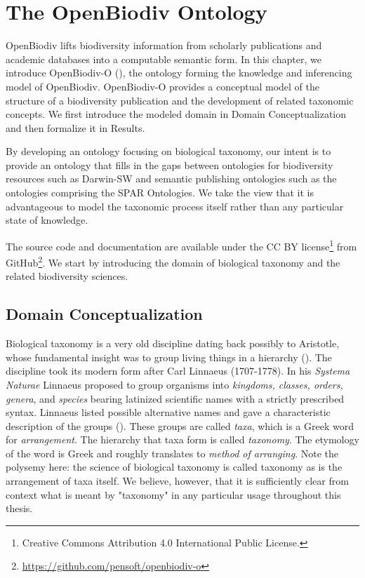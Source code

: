 \chapter{The OpenBiodiv Ontology}

\label{chapter-ontology}

OpenBiodiv lifts biodiversity information from scholarly publications and academic databases into a computable semantic form.  In this chapter, we introduce \mbox{OpenBiodiv-O} (\cite{senderov_openbiodiv-o:_2018}), the ontology forming the knowledge and inferencing model of OpenBiodiv. \mbox{OpenBiodiv-O} provides a conceptual model of the structure of a biodiversity publication and the development of related taxonomic concepts. We first introduce the modeled domain in Domain Conceptualization and then formalize it in Results. 

By developing an ontology focusing on biological taxonomy, our intent is to provide an ontology that fills in the gaps between ontologies for biodiversity resources such as Darwin-SW and semantic publishing ontologies such as the ontologies comprising the SPAR Ontologies. We take the view that it is advantageous to model the taxonomic process itself rather than any particular state of knowledge.

The source code and documentation are available under the CC BY license\footnote{Creative Commons Attribution 4.0 International Public License.} from GitHub\footnote{\href{https://github.com/pensoft/openbiodiv-o/blob/master/LICENSE.md}{https://github.com/pensoft/openbiodiv-o}}. We start by introducing the domain of biological taxonomy and the related biodiversity sciences.

\section{Domain Conceptualization}

Biological taxonomy is a very old discipline dating back possibly to Aristotle, whose fundamental insight was to group living things in a hierarchy (\cite{manktelow_history_2010}). The discipline took its modern form after Carl Linnaeus (1707-1778). In his \emph{Systema Naturae} Linnaeus proposed to group organisms into \emph{kingdoms, classes, orders, genera}, and \emph{species} bearing latinized scientific names with a strictly prescribed syntax. Linnaeus listed possible alternative names and gave a characteristic description of the groups (\cite{linnaeus_systema_1758}). These groups are called \emph{taxa}, which is a Greek word for \emph{arrangement}. The hierarchy that taxa form is called \emph{taxonomy}. The etymology of the word is Greek and roughly translates to \emph{method of arranging}. Note the polysemy here: the science of biological taxonomy is called taxonomy as is the arrangement of taxa itself. We believe, however, that it is sufficiently clear from context what is meant by "taxonomy" in any particular usage throughout this thesis.


